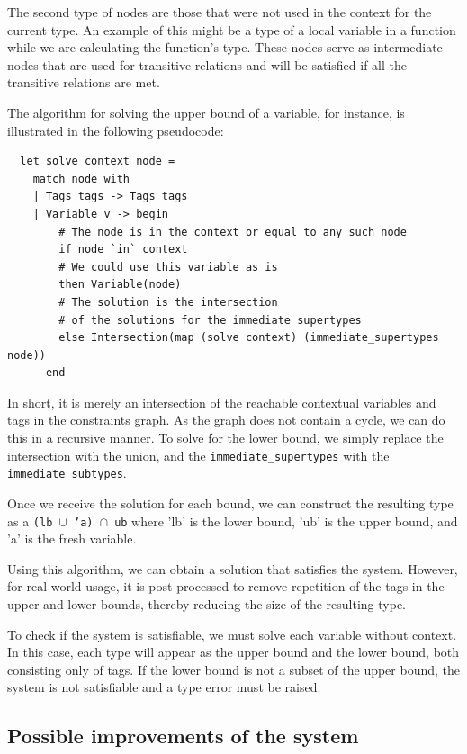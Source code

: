 \documentclass[a4paper,11pt,oneside]{article}
\theoremstyle{definition}
\begin{document}
The second type of nodes are those that were not used in the context for the current type. An example of this might be a type of a local variable in a function while we are calculating the function's type. These nodes serve as intermediate nodes that are used for transitive relations and will be satisfied if all the transitive relations are met.

The algorithm for solving the upper bound of a variable, for instance, is illustrated in the following pseudocode:

{\ttfamily\begin{verbatim}
  let solve context node =
    match node with
    | Tags tags -> Tags tags
    | Variable v -> begin
        # The node is in the context or equal to any such node
        if node `in` context
        # We could use this variable as is
        then Variable(node)
        # The solution is the intersection
        # of the solutions for the immediate supertypes
        else Intersection(map (solve context) (immediate_supertypes node))
      end
\end{verbatim}}

In short, it is merely an intersection of the reachable contextual variables and tags in the constraints graph. As the graph does not contain a cycle, we can do this in a recursive manner. To solve for the lower bound, we simply replace the intersection with the union, and the \texttt{immediate\_supertypes} with the \texttt{immediate\_subtypes}.

Once we receive the solution for each bound, we can construct the resulting type as a \texttt{(lb $\cup$ 'a) $\cap$ ub} where 'lb' is the lower bound, 'ub' is the upper bound, and 'a' is the fresh variable.

Using this algorithm, we can obtain a solution that satisfies the system. However, for real-world usage, it is post-processed to remove repetition of the tags in the upper and lower bounds, thereby reducing the size of the resulting type.

To check if the system is satisfiable, we must solve each variable without context. In this case, each type will appear as the upper bound and the lower bound, both consisting only of tags. If the lower bound is not a subset of the upper bound, the system is not satisfiable and a type error must be raised.

\subsection{Possible improvements of the system}
\end{document}
